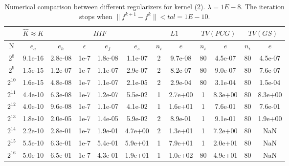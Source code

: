 \documentclass[11pt]{article}
\begin{document}
\begin{table}[!htbp]
\centering
\begin{tabular}{|c|c|c|c|c|c|c|c|c|c|c|c|}
\hline
\multicolumn{1}{c|}{} & \multicolumn{1}{c|}{$\hat{K} \approx K$} & \multicolumn{4}{c|}{$HIF$} & \multicolumn{2}{c|}{$L1$} &\multicolumn{2}{c|}{$TV(PCG)$} & \multicolumn{2}{c|}{$TV(GS)$} \\
\hline
N & $e_{a}$ & $e_{h}$ & $\epsilon$ & $e_{f}$ & $e_{s}$ & $n_{i}$ & $e$  & $n_{i}$ & $e$ &  $n_{i}$ & $e$ \\ 
\hline
$2^{8}$ & 9.1e-16 & 2.8e-08 & 1e-7 & 1.8e-08 & 1.1e-07 & 2 & 9.7e-08 & 80 & 4.5e-07 & 80 & 4.5e-07\\
\hline
$2^{9}$ & 1.5e-15 & 1.2e-07 & 1e-7 & 1.1e-07 & 2.9e-07 & 2 & 8.2e-07 & 80 & 9.0e-07 & 80 & 7.6e-07\\
\hline
$2^{10}$ & 1.6e-15 & 4.8e-08 & 1e-7 & 1.1e-07 & 2.1e-05 & 2 & 2.9e-04 & 80 & 3.1e-04 & 80 & 1.5e-04\\
\hline
$2^{11}$ & 4.4e-10 & 6.3e-08 & 1e-7 & 1.2e-07 & 5.5e-02 & 1 & 2.7e+00 & 1 & 8.3e+00 & 80 & 8.3e+00\\
\hline
$2^{12}$ & 4.0e-10 & 9.6e-08 & 1e-7 & 1.1e-07 & 4.1e-02 & 1 & 1.6e+01 & 1 & 7.6e-01 & 80 & 7.6e-01\\
\hline
$2^{13}$ & 1.8e-10 & 2.0e-05 & 1e-7 & 1.4e-05 & 5.9e-02 & 2 & 8.9e-01 & 1 & 9.1e-01 & 80 & 1.9e+00\\
\hline
$2^{14}$ & 2.2e-10 & 2.8e-01 & 1e-7 & 1.9e-01 & 4.7e+00 & 2 & 1.3e+01 & 1 & 7.2e+00 & 80 & NaN\\
\hline
$2^{15}$ & 5.5e-10 & 6.3e-01 & 1e-7 & 5.4e-01 & 5.9e+01 & 1 & 7.9e+01 & 1 & 2.0e+01 & 80 & NaN\\
\hline
$2^{16}$ & 5.0e-10 & 6.5e-01 & 1e-7 & 4.3e-01 & 1.9e+01 & 1 & 1.0e+02 & 80 & 4.9e+01 & 80 & NaN\\

\end{tabular}

\caption{Numerical comparison between different regularizers for kernel (2). $\lambda = 1E-8$. The iteration stops when $\|f^{k+1}-f^{k}\| < tol=1E-10$.}
\label{1d-k2}
\end{table}
\end{document}
